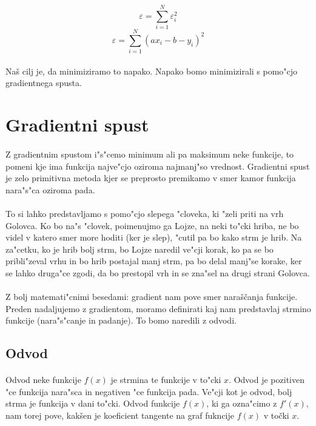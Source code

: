 \documentclass[a4paper, 12pt]{article}
\begin{document}
	$$\varepsilon = \sum_{i=1}^{N} \varepsilon_i^2$$
	$$\varepsilon = \sum_{i=1}^{N} (a x_i - b - y_i)^2$$
	
	\paragraph{}
	Naš cilj je, da minimiziramo to napako. Napako bomo minimizirali s pomo"cjo gradientnega spusta.
	
	\section*{Gradientni spust}
	\paragraph{}
	Z gradientnim spustom i"s"cemo minimum ali pa maksimum neke funkcije, to pomeni kje ima funkcija najve"cjo oziroma najmanj"so vrednost. Gradientni spust je zelo primitivna metoda kjer se preprosto premikamo v smer kamor funkcija nara"s"ca oziroma pada. 
	
	\paragraph{}
	To si lahko predstavljamo s pomo"cjo slepega "cloveka, ki "zeli priti na vrh Golovca. Ko bo na"s "clovek, poimenujmo ga Lojze, na neki to"cki hriba, ne bo videl v katero smer more hoditi (ker je slep), "cutil pa bo kako strm je hrib. Na za"cetku, ko je hrib bolj strm, bo Lojze naredil ve"cji korak, ko pa se bo pribli"zeval vrhu in bo hrib postajal manj strm, pa bo delal manj"se korake, ker se lahko druga"ce zgodi, da bo prestopil vrh in se zna"sel na drugi strani Golovca.
	
	\paragraph{}
	Z bolj matemati"cnimi besedami: gradient nam pove smer naraščanja funkcije. Preden nadaljujemo z gradientom, moramo definirati kaj nam predstavlaj strmino funkcije (nara"s"canje in padanje). To bomo naredili z odvodi.
	
	\subsection*{Odvod}
	\paragraph{}
	Odvod neke funkcije $f(x)$ je strmina te funkcije v to"cki $x$. Odvod je pozitiven "ce funkcija nara"sca in negativen "ce funkcija pada. Ve"cji kot je odvod, bolj strma je funkcija v dani to"cki. Odvod funkcije $f(x)$, ki ga ozna"cimo z $f'(x)$, nam torej pove, kakšen je koeficient tangente na graf fukncije $ f(x) $ v točki $x$.
	
\end{document}
